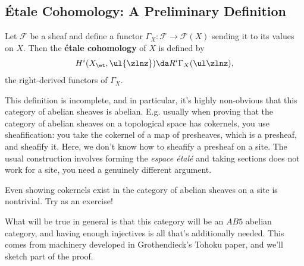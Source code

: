 \hypertarget{uxe9tale-cohomology-a-preliminary-definition}{%
\subsection{Étale Cohomology: A Preliminary
Definition}\label{uxe9tale-cohomology-a-preliminary-definition}}

\begin{definition}

Let \(\mathcal{F}\) be a sheaf and define a functor
\(\Gamma_X: \mathcal{F}\to \mathcal{F}(X)\) sending it to its values on
\(X\). Then the \textbf{étale cohomology} of \(X\) is defined by
\begin{align*}  
H^i(X_\et, \ul{\zlnz}) \da R^i \Gamma_X(\ul \zlnz)
,\end{align*} the right-derived functors of \(\Gamma_X\).

\end{definition}

\begin{remark}

This definition is incomplete, and in particular, it's highly
non-obvious that this category of abelian sheaves is abelian. E.g.
usually when proving that the category of abelian sheaves on a
topological space has cokernels, you use sheafification: you take the
cokernel of a map of presheaves, which is a presheaf, and sheafify it.
Here, we don't know how to sheafify a presheaf on a site. The usual
construction involves forming the \emph{espace étalé} and taking
sections does not work for a site, you need a genuinely different
argument.

\end{remark}

\begin{warnings}

Even showing cokernels exist in the category of abelian sheaves on a
site is nontrivial. Try as an exercise!

\end{warnings}

\begin{remark}

What will be true in general is that this category will be an \(AB5\)
abelian category, and having enough injectives is all that's
additionally needed. This comes from machinery developed in
Grothendieck's Tohoku paper, and we'll sketch part of the proof.

\end{remark}

